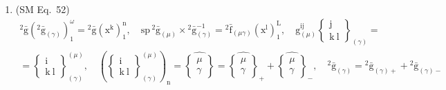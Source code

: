 \documentclass[12pt]{article}
\begin{document}
\begin{enumerate}[label=(\arabic*), series=formellist]
    \item (SM Eq.\ 52) 
    \[
    \begin{gathered}
    {}^2\bar{\mathrm{g}} \left( {}^2\bar{\mathrm{g}}_{(\gamma)} \right)_1^\omega = {}^2\bar{\mathrm{g}}(\mathrm{x^k})_1^\mathrm{n}, \quad \mathrm{sp} \, {}^2\bar{\mathrm{g}}_{(\mu)} \times {}^2\bar{\mathrm{g}}_{(\gamma)}^{-1} = {}^2\bar{\mathrm{f}}_{(\mu\gamma)} (\mathrm{x^l})_1^\mathrm{L}, \quad \mathrm{g}_{(\mu)}^{\mathrm{ij}} \left\{ \begin{smallmatrix} \mathrm{j} \\ \mathrm{k\ l} \end{smallmatrix} \right\}_{(\gamma)} = \\
    = \left\{ \begin{smallmatrix} \mathrm{i} \\ \mathrm{k\ l} \end{smallmatrix} \right\}^{(\mu)}_{(\gamma)}, \quad \left( \left\{ \begin{smallmatrix} \mathrm{i} \\ \mathrm{k\ l} \end{smallmatrix} \right\}^{(\mu)}_{(\gamma)} \right)_\mathrm{n} = \widehat{\left\{ \begin{smallmatrix} \mu \\ \gamma \end{smallmatrix} \right\}} = \widehat{\left\{ \begin{smallmatrix} \mu \\ \gamma \end{smallmatrix} \right\}}_+ + \widehat{\left\{ \begin{smallmatrix} \mu \\ \gamma \end{smallmatrix} \right\}}_-, \quad {}^2\bar{\mathrm{g}}_{(\gamma)} = {}^2\bar{\mathrm{g}}_{(\gamma)+} + {}^2\bar{\mathrm{g}}_{(\gamma)-}
    \end{gathered}
    \]


\end{enumerate}
\end{document}
